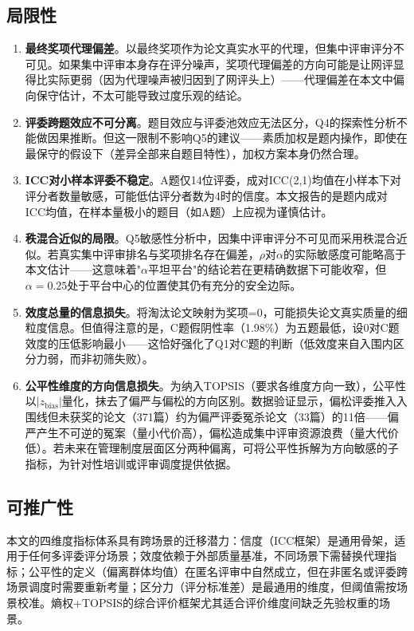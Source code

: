 \documentclass[UTF8,12pt]{ctexart}
\begin{document}
\subsection{局限性}

\begin{enumerate}
    \item \textbf{最终奖项代理偏差}。以最终奖项作为论文真实水平的代理，但集中评审评分不可见。如果集中评审本身存在评分噪声，奖项代理偏差的方向可能是让网评显得比实际更弱（因为代理噪声被归因到了网评头上）——代理偏差在本文中偏向保守估计，不太可能导致过度乐观的结论。
    \item \textbf{评委跨题效应不可分离}。题目效应与评委池效应无法区分，Q4的探索性分析不能做因果推断。但这一限制不影响Q5的建议——素质加权是题内操作，即使在最保守的假设下（差异全部来自题目特性），加权方案本身仍然合理。
    \item \textbf{ICC对小样本评委不稳定}。A题仅14位评委，成对ICC(2,1)均值在小样本下对评分者数量敏感，可能低估评分者数为4时的信度。本文报告的是题内成对ICC均值，在样本量极小的题目（如A题）上应视为谨慎估计。
    \item \textbf{秩混合近似的局限}。Q5敏感性分析中，因集中评审评分不可见而采用秩混合近似。若真实集中评审排名与奖项排名存在偏差，$\rho$对$\alpha$的实际敏感度可能略高于本文估计——这意味着"$\alpha$平坦平台"的结论若在更精确数据下可能收窄，但$\alpha=0.25$处于平台中心的位置使其仍有充分的安全边际。
    \item \textbf{效度总量的信息损失}。将淘汰论文映射为奖项=0，可能损失论文真实质量的细粒度信息。但值得注意的是，C题假阴性率（1.98\%）为五题最低，设0对C题效度的压低影响最小——这恰好强化了Q1对C题的判断（低效度来自入围内区分力弱，而非初筛失败）。
    \item \textbf{公平性维度的方向信息损失}。为纳入TOPSIS（要求各维度方向一致），公平性以$|z_{\text{bias}}|$量化，抹去了偏严与偏松的方向区别。数据验证显示，偏松评委推入入围线但未获奖的论文（371篇）约为偏严评委冤杀论文（33篇）的11倍——偏严产生不可逆的冤案（量小代价高），偏松造成集中评审资源浪费（量大代价低）。若未来在管理制度层面区分两种偏离，可将公平性拆解为方向敏感的子指标，为针对性培训或评审调度提供依据。
\end{enumerate}

\subsection{可推广性}

本文的四维度指标体系具有跨场景的迁移潜力：信度（ICC框架）是通用骨架，适用于任何多评委评分场景；效度依赖于外部质量基准，不同场景下需替换代理指标；公平性的定义（偏离群体均值）在匿名评审中自然成立，但在非匿名或评委跨场景调度时需要重新考量；区分力（评分标准差）是最通用的维度，但阈值需按场景校准。熵权+TOPSIS的综合评价框架尤其适合评价维度间缺乏先验权重的场景。
\end{document}
